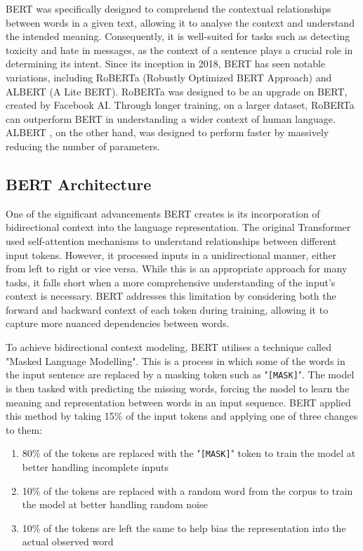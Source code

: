 BERT was specifically designed to comprehend the contextual relationships between words in a given text, allowing it to analyse the context and understand the intended meaning. Consequently, it is well-suited for tasks such as detecting toxicity and hate in messages, as the context of a sentence plays a crucial role in determining its intent. Since its inception in 2018, BERT has seen notable variations, including RoBERTa (Robustly Optimized BERT Approach) and ALBERT (A Lite BERT). RoBERTa \cite{RoBERTa} was designed to be an upgrade on BERT, created by Facebook AI. Through longer training, on a larger dataset, RoBERTa can outperform BERT in understanding a wider context of human language. ALBERT \cite{AlBERT}, on the other hand, was designed to perform faster by massively reducing the number of parameters.

\subsection{BERT Architecture}

One of the significant advancements BERT creates is its incorporation of bidirectional context into the language representation. The original Transformer used self-attention mechanisms to understand relationships between different input tokens. However, it processed inputs in a unidirectional manner, either from left to right or vice versa. While this is an appropriate approach for many tasks, it falls short when a more comprehensive understanding of the input's context is necessary. BERT addresses this limitation by considering both the forward and backward context of each token during training, allowing it to capture more nuanced dependencies between words.

To achieve bidirectional context modeling, BERT utilises a technique called "Masked Language Modelling". This is a process in which some of the words in the input sentence are replaced by a masking token such as "\verb|[MASK]|". The model is then tasked with predicting the missing words, forcing the model to learn the meaning and representation between words in an input sequence. BERT applied this method by taking 15\% of the input tokens and applying one of three changes to them:

\begin{enumerate}[itemsep=0pt, topsep=1pt]
    \item 80\% of the tokens are replaced with the "\verb|[MASK]|" token to train the model at better handling incomplete inputs
    \item 10\% of the tokens are replaced with a random word from the corpus to train the model at better handling random noise
    \item 10\% of the tokens are left the same to help bias the representation into the actual observed word
\end{enumerate}

